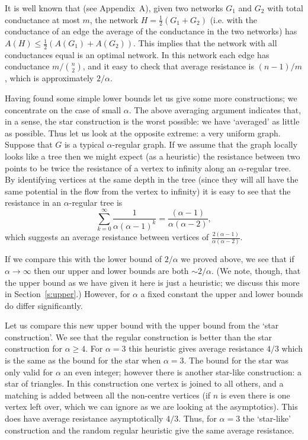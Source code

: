 \documentclass[11pt]{article}
\theoremstyle{remark}
\begin{document}
It is well known that (see Appendix~A), given two networks
$G_1$ and $G_2$ with total conductance at most $m$, the network
$H=\frac12(G_1+G_2)$ (i.e. with the conductance of an edge the average
of the conductance in the two networks) has $A(H)\le
\frac12\left(A(G_1)+A(G_2)\right)$. This implies that the network with
all conductances equal is an optimal network. In this network each edge has
conductance $m/\binom n2$, and it easy to check that average
resistance is $(n-1)/m$, which is approximately $2/\alpha$.

  Having found some simple lower bounds let us give some more
  constructions; we concentrate on the case of small $\alpha$. The
  above averaging argument indicates that, in a sense, the star
  construction is the worst possible: we have `averaged' as little as
  possible. Thus let us look at the opposite extreme: a very uniform
  graph. Suppose that $G$ is a typical $\alpha$-regular graph. If we
  assume that the graph locally looks like a tree then we might expect
  (as a heuristic) the resistance between two points to be twice the
  resistance of a vertex to infinity along an $\alpha$-regular
  tree. By identifying vertices at the same depth in the tree (since they will all
  have the same potential in the flow from the vertex to infinity) it
  is easy to see that the resistance in an $\alpha$-regular tree is
\[
\sum_{k=0}^\infty\frac1{\alpha(\alpha-1)^k}=\frac{(\alpha-1)}{\alpha(\alpha-2)},
\]
which suggests an average resistance between vertices of
$\frac{2(\alpha-1)}{\alpha(\alpha-2)}$.  

If we compare this with the lower bound of $2/\alpha$ we proved above,
we see that if $\alpha\to \infty$ then our upper and lower bounds are
both $\sim 2/\alpha$. (We note, though, that the upper bound as we
have given it here is just a heuristic; we discuss this more in
Section~\ref{s:upper}.) However, for $\alpha$ a fixed constant the
upper and lower bounds do differ significantly.

Let us compare this new upper bound with the upper bound from the
`star construction'. We see that the regular construction is better
than the star construction for $\alpha \ge 4$. For $\alpha=3$ this
heuristic gives average resistance $4/3$ which is the same as the
bound for the star when $\alpha=3$. The bound for the star was only
valid for $\alpha$ an even integer; however there is another star-like
construction: a star of triangles. In this construction one vertex is
joined to all others, and a matching is added between all the 
non-centre vertices (if $n$ is even there is one vertex left over,
which we can ignore as we are looking at the asymptotics). This does
have average resistance asymptotically $4/3$. Thus, for $\alpha=3$ the
`star-like' construction and the random regular heuristic give the
same average resistance.
\end{document}
